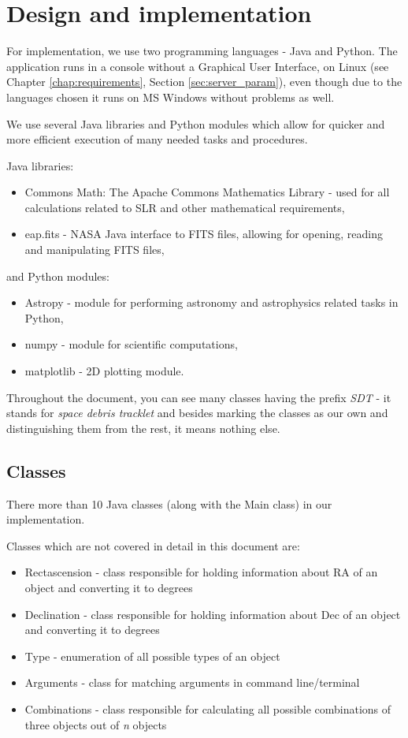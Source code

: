 \chapter{Design and implementation}\label{chap:design}

	For implementation, we use two programming languages - Java and Python. The application runs in a console without a Graphical User Interface, on Linux (see Chapter \ref{chap:requirements}, Section \ref{sec:server_param}), even though due to the languages chosen it runs on MS Windows without problems as well.
	
	We use several Java libraries and Python modules which allow for quicker and more efficient execution of many needed tasks and procedures.
	
	Java libraries:
\begin{itemize}
	\item Commons Math: The Apache Commons Mathematics Library - used for all calculations related to SLR and other mathematical requirements,
	\item eap.fits - NASA Java interface to FITS files, allowing for opening, reading and manipulating FITS files,
\end{itemize}		

and Python modules:
\begin{itemize}
	\item Astropy - module for performing astronomy and astrophysics related tasks in Python,
	\item numpy - module for scientific computations,
	\item matplotlib - 2D plotting module.
\end{itemize}

	Throughout the document, you can see many classes having the prefix \emph{SDT} - it stands for \emph{space debris tracklet} and besides marking the classes as our own and distinguishing them from the rest, it means nothing else.

\section{Classes}\label{sec:classes}

	There more than 10 Java classes (along with the Main class) in our implementation.
	
	Classes which are not covered in detail in this document are:
	
\begin{itemize}
	\item Rectascension - class responsible for holding information about RA of an object and converting it to degrees
	\item Declination - class responsible for holding information about Dec of an object and converting it to degrees
	\item Type - enumeration of all possible types of an object
	\item Arguments - class for matching arguments in command line/terminal
	\item Combinations - class responsible for calculating all possible combinations of three objects out of \emph{n} objects
\end{itemize}

